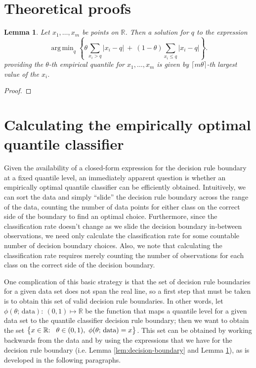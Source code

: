 \documentclass{article}
\DeclareMathOperator*{\argmin}{arg\,min}
\newtheorem{lemma}[theorem]{Lemma}
\begin{document}
\section{Theoretical proofs}
\label{sec:theoretical-proofs}

\begin{lemma}
  \label{lem:empirical-quantlev}
  Let $x_1, \dots, x_m$ be points on $\mathbb{R}$.  Then a solution for $q$ to
  the expression
  \begin{equation}
    \label{eq:empirical-quantile}
    \argmin_q \left\{
      \theta \sum_{ x_{i} > q } |x_{i} - q| ~+~
      (1 - \theta) \sum_{ x_{i} \leq q } |x_{i} - q|
    \right\}.
  \end{equation}
  providing the $\theta$-th empirical quantile for
  $x_1, \dots, x_m$ is given by $\lceil m \theta \rceil$-th largest value of the
  $x_i$.
\end{lemma}

\begin{proof}
  
\end{proof}




\section{Calculating the empirically optimal quantile classifier}
\label{sec:empirically-optimal-algo}

Given the availability of a closed-form expression for the decision rule
boundary at a fixed quantile level, an immediately apparent question is whether
an empirically optimal quantile classifier can be efficiently obtained.
Intuitively, we can sort the data and simply ``slide'' the decision rule
boundary across the range of the data, counting the number of data points for
either class on the correct side of the boundary to find an optimal choice.
Furthermore, since the classification rate doesn't change as we slide the
decision boundary in-between observations, we need only calculate the
classification rate for some countable number of decision boundary choices.
Also, we note that calculating the classification rate requires merely counting
the number of observations for each class on the correct side of the decision
boundary.

One complication of this basic strategy is that the set of decision rule
boundaries for a given data set does not span the real line, so a first step
that must be taken is to obtain this set of valid decision rule boundaries.  In
other words, let $\phi(\theta;\, \text{data}){:}~ (0, 1) \mapsto \mathbb{R}$ be
the function that maps a quantile level for a given data set to the quantile
classifier decision rule boundary; then we want to obtain the set
$\big\{ x \in \mathbb{R}{:} \hspace{3mm} \theta \in (0, 1),~ \phi(\theta;\,
\text{data}) = x \big\}$.  This set can be obtained by working backwards from
the data and by using the expressions that we have for the decision rule
boundary (i.e. Lemma \ref{lem:decision-boundary} and Lemma
\ref{lem:empirical-quantlev}), as is developed in the following paragraphs.
\end{document}
